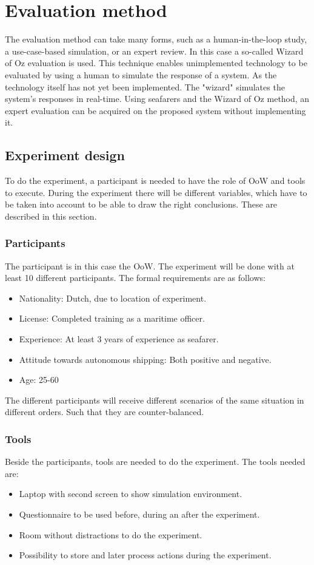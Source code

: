 \section{Evaluation method}
The evaluation method can take many forms, such as a human-in-the-loop study, a use-case-based simulation, or an expert review. In this case a so-called Wizard of Oz evaluation is used. This technique enables unimplemented technology to be evaluated by using a human to simulate the response of a system. As the technology itself has not yet been implemented. The "wizard" simulates the system's responses in real-time. Using seafarers and the Wizard of Oz method, an expert evaluation can be acquired on the proposed system without implementing it.

\subsection{Experiment design}
To do the experiment, a participant is needed to have the role of \acf{OoW} and tools to execute. During the experiment there will be different variables, which have to be taken into account to be able to draw the right conclusions. These are described in this section.

\subsubsection{Participants}
The participant is in this case the \acf{OoW}. The experiment will be done with at least 10 different participants. The formal requirements are as follows:
\begin{itemize}
	\item Nationality: Dutch, due to location of experiment.
	\item License: Completed training as a maritime officer.
	\item Experience: At least 3 years of experience as seafarer.
	\item Attitude towards autonomous shipping: Both positive and negative.
	\item Age: 25-60
\end{itemize}
The different participants will receive different scenarios of the same situation in different orders. Such that they are counter-balanced.

\subsubsection{Tools}
Beside the participants, tools are needed to do the experiment. The tools needed are:
\begin{itemize}
	\item Laptop with second screen to show simulation environment.
	\item Questionnaire to be used before, during an after the experiment.
	\item Room without distractions to do the experiment.
	\item Possibility to store and later process actions during the experiment.
\end{itemize}

